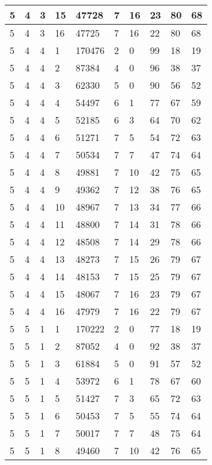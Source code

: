 \begin{table}[!ht]
\begin{tabular}{|l|l|l|l|l|l|l|l|l|l|}
        5 & 4 & 3 & 15 & 47728 & 7 & 16 & 23 & 80 & 68 \\ \hline
        5 & 4 & 3 & 16 & 47725 & 7 & 16 & 22 & 80 & 68 \\ \hline
        5 & 4 & 4 & 1 & 170476 & 2 & 0 & 99 & 18 & 19 \\ \hline
        5 & 4 & 4 & 2 & 87384 & 4 & 0 & 96 & 38 & 37 \\ \hline
        5 & 4 & 4 & 3 & 62330 & 5 & 0 & 90 & 56 & 52 \\ \hline
        5 & 4 & 4 & 4 & 54497 & 6 & 1 & 77 & 67 & 59 \\ \hline
        5 & 4 & 4 & 5 & 52185 & 6 & 3 & 64 & 70 & 62 \\ \hline
        5 & 4 & 4 & 6 & 51271 & 7 & 5 & 54 & 72 & 63 \\ \hline
        5 & 4 & 4 & 7 & 50534 & 7 & 7 & 47 & 74 & 64 \\ \hline
        5 & 4 & 4 & 8 & 49881 & 7 & 10 & 42 & 75 & 65 \\ \hline
        5 & 4 & 4 & 9 & 49362 & 7 & 12 & 38 & 76 & 65 \\ \hline
        5 & 4 & 4 & 10 & 48967 & 7 & 13 & 34 & 77 & 66 \\ \hline
        5 & 4 & 4 & 11 & 48800 & 7 & 14 & 31 & 78 & 66 \\ \hline
        5 & 4 & 4 & 12 & 48508 & 7 & 14 & 29 & 78 & 66 \\ \hline
        5 & 4 & 4 & 13 & 48273 & 7 & 15 & 26 & 79 & 67 \\ \hline
        5 & 4 & 4 & 14 & 48153 & 7 & 15 & 25 & 79 & 67 \\ \hline
        5 & 4 & 4 & 15 & 48067 & 7 & 16 & 23 & 79 & 67 \\ \hline
        5 & 4 & 4 & 16 & 47979 & 7 & 16 & 22 & 79 & 67 \\ \hline
        5 & 5 & 1 & 1 & 170222 & 2 & 0 & 77 & 18 & 19 \\ \hline
        5 & 5 & 1 & 2 & 87052 & 4 & 0 & 92 & 38 & 37 \\ \hline
        5 & 5 & 1 & 3 & 61884 & 5 & 0 & 91 & 57 & 52 \\ \hline
        5 & 5 & 1 & 4 & 53972 & 6 & 1 & 78 & 67 & 60 \\ \hline
        5 & 5 & 1 & 5 & 51427 & 7 & 3 & 65 & 72 & 63 \\ \hline
        5 & 5 & 1 & 6 & 50453 & 7 & 5 & 55 & 74 & 64 \\ \hline
        5 & 5 & 1 & 7 & 50017 & 7 & 7 & 48 & 75 & 64 \\ \hline
        5 & 5 & 1 & 8 & 49460 & 7 & 10 & 42 & 76 & 65 \\ \hline

\end{tabular}
\end{table}

